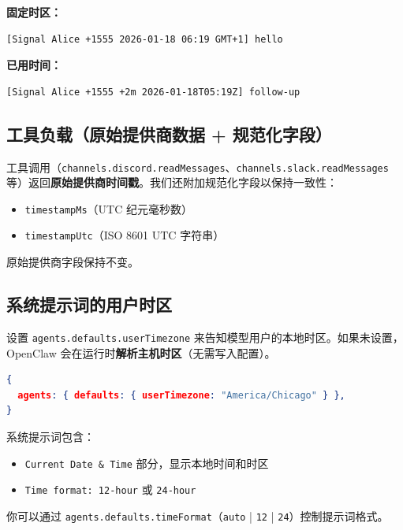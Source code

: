 \textbf{固定时区：}

\begin{lstlisting}
[Signal Alice +1555 2026-01-18 06:19 GMT+1] hello
\end{lstlisting}


\textbf{已用时间：}

\begin{lstlisting}
[Signal Alice +1555 +2m 2026-01-18T05:19Z] follow-up
\end{lstlisting}


\subsection{工具负载（原始提供商数据 + 规范化字段）}


工具调用（\texttt{channels.discord.readMessages}、\texttt{channels.slack.readMessages} 等）返回\textbf{原始提供商时间戳}。我们还附加规范化字段以保持一致性：

\begin{itemize}
  \item \texttt{timestampMs}（UTC 纪元毫秒数）
  \item \texttt{timestampUtc}（ISO 8601 UTC 字符串）
\end{itemize}


原始提供商字段保持不变。

\subsection{系统提示词的用户时区}


设置 \texttt{agents.defaults.userTimezone} 来告知模型用户的本地时区。如果未设置，OpenClaw 会在运行时\textbf{解析主机时区}（无需写入配置）。

\begin{lstlisting}[language=json]
{
  agents: { defaults: { userTimezone: "America/Chicago" } },
}
\end{lstlisting}


系统提示词包含：

\begin{itemize}
  \item \texttt{Current Date \& Time} 部分，显示本地时间和时区
  \item \texttt{Time format: 12-hour} 或 \texttt{24-hour}
\end{itemize}


你可以通过 \texttt{agents.defaults.timeFormat}（\texttt{auto} | \texttt{12} | \texttt{24}）控制提示词格式。


